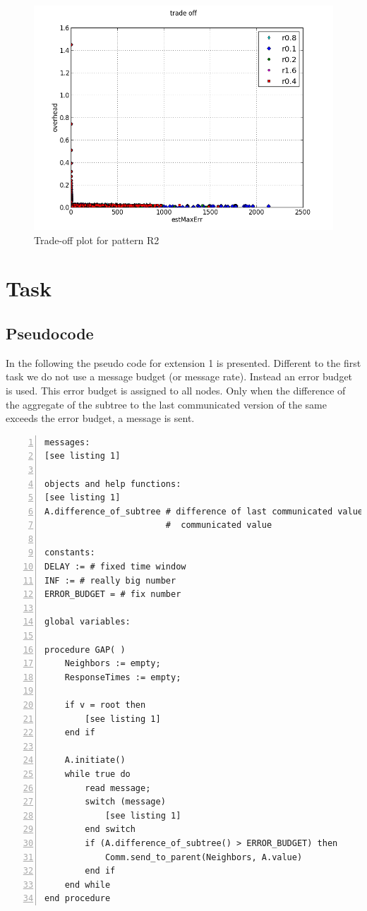 \documentclass[a4paper, smallheadings,english]{scrartcl}
\begin{document}
\begin{figure}[h!]
    \begin{center}
        \includegraphics[scale=0.7]{plots/task1/trade_off_R2}
    \end{center}
    \caption{Trade-off plot for pattern R2}
    \label{fig:task1_trade_off_r2}
\end{figure}

\section{Task}
\label{sec:task2}
\subsection{Pseudocode}
In the following the pseudo code for extension 1 is presented. Different to the first task we do not use a message budget (or message rate). Instead an error budget is used. This error budget is assigned to all nodes. Only when the difference of the aggregate of the subtree to the last communicated version of the same exceeds the error budget, a message is sent.

\begin{lstlisting}[caption={Pseudocode for $\widetilde{f}(t)$ with error budget in $P_1$}, label={lst:2}, numbers=left, frame=single]
messages:
[see listing 1]

objects and help functions:
[see listing 1]
A.difference_of_subtree # difference of last communicated value versus current
                        #  communicated value

constants:
DELAY := # fixed time window
INF := # really big number
ERROR_BUDGET = # fix number

global variables:

procedure GAP( )
    Neighbors := empty;
    ResponseTimes := empty;

    if v = root then
        [see listing 1]
    end if

    A.initiate()
    while true do
        read message;
        switch (message)
            [see listing 1]
        end switch
        if (A.difference_of_subtree() > ERROR_BUDGET) then
            Comm.send_to_parent(Neighbors, A.value)
        end if
    end while
end procedure
\end{lstlisting}
\end{document}
